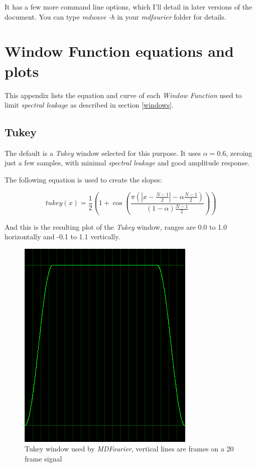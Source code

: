 \documentclass[10pt,a4paper]{report}
\begin{document}
\begin{appendices}
It has a few more command line options, which I'll detail in later versions of the document. You can type \textit{mdwave -h} in your \textit{mdfourier} folder for details.

\chapter{Window Function equations and plots}
\label{windowfunctiondetails}

This appendix lists the equation and curve of each \textit{Window Function} used to limit \textit{spectral leakage} as described in section \ref{windows}.

\newpage
\section{Tukey}

The default is a \textit{Tukey} window selected for this purpose. It uses $\alpha = 0.6$, zeroing just a few samples, with minimal \textit{spectral leakage} and good amplitude response.

The following equation is used to create the slopes:

\begin{equation}
tukey(x)=\frac{1}{2}(1+\cos(\frac{\pi(|x-\frac{N-1}{2}|-\alpha \frac{N-1}{2})}{(1-\alpha)\frac{N-1}{2}}))
\end{equation}

And this is the resulting plot of the \textit{Tukey} window, ranges are 0.0 to 1.0 horizontally and -0.1 to 1.1 vertically.

\begin{figure}[H]
	\centering
	\includegraphics[width=0.4\linewidth]{images/windows/window-tukey.png}
	\caption[Tukey Window]{Tukey window used by \textit{MDFourier}, vertical lines are frames on a 20 frame signal}
	\label{fig:window-tukey}
\end{figure}


\end{appendices}
\end{document}
